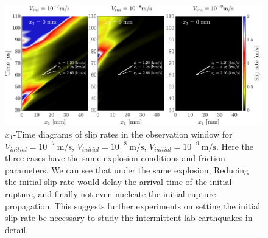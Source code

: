 \documentclass[final,a4paper]{elsarticle}
\begin{document}
\begin{figure}[htbp]
    \centering
    \includegraphics[width=1.0\textwidth]{figures/V_initial_explosion_const.pdf}
    \caption{$x_1$-Time diagrams of slip rates in the observation window for $V_{initial} = 10^{-7}\ \mathrm{m/s}$, 
    $V_{initial} = 10^{-8}\ \mathrm{m/s}$, 
    $V_{initial} = 10^{-9}\ \mathrm{m/s}$. 
    Here the three cases have the same explosion conditions and friction parameters. 
    We can see that under the same explosion, 
    Reducing the initial slip rate would delay the arrival time of the initial rupture, 
    and finally not even nucleate the initial rupture propagation. 
    This suggests further experiments on setting the initial slip rate be necessary to study the intermittent lab earthquakes in detail.
    }
    \label{fig:VInitialConstExplosion}
\end{figure}
\end{document}
